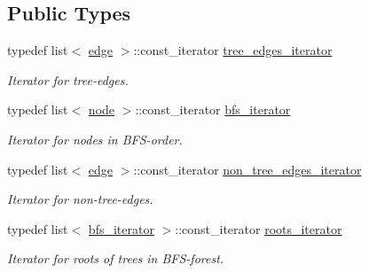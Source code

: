 \subsection*{Public Types}
\begin{DoxyCompactItemize}
\item 
\mbox{\label{classbfs_aa0b58a03ca2fc32117948ab27a806bd1}} 
typedef list$<$ \mbox{\hyperlink{classedge}{edge}} $>$\+::const\+\_\+iterator \mbox{\hyperlink{classbfs_aa0b58a03ca2fc32117948ab27a806bd1}{tree\+\_\+edges\+\_\+iterator}}
\begin{DoxyCompactList}\small\item\em Iterator for tree-\/edges. \end{DoxyCompactList}\item 
\mbox{\label{classbfs_acafce54954100cc7bc9f80eb318a7bee}} 
typedef list$<$ \mbox{\hyperlink{classnode}{node}} $>$\+::const\+\_\+iterator \mbox{\hyperlink{classbfs_acafce54954100cc7bc9f80eb318a7bee}{bfs\+\_\+iterator}}
\begin{DoxyCompactList}\small\item\em Iterator for nodes in B\+F\+S-\/order. \end{DoxyCompactList}\item 
\mbox{\label{classbfs_aecd86c7c1f1086d4b6b11c2a0eb12afe}} 
typedef list$<$ \mbox{\hyperlink{classedge}{edge}} $>$\+::const\+\_\+iterator \mbox{\hyperlink{classbfs_aecd86c7c1f1086d4b6b11c2a0eb12afe}{non\+\_\+tree\+\_\+edges\+\_\+iterator}}
\begin{DoxyCompactList}\small\item\em Iterator for non-\/tree-\/edges. \end{DoxyCompactList}\item 
\mbox{\label{classbfs_a386ac6f3c63e38c3f5263e15c3ab9d01}} 
typedef list$<$ \mbox{\hyperlink{classbfs_acafce54954100cc7bc9f80eb318a7bee}{bfs\+\_\+iterator}} $>$\+::const\+\_\+iterator \mbox{\hyperlink{classbfs_a386ac6f3c63e38c3f5263e15c3ab9d01}{roots\+\_\+iterator}}
\begin{DoxyCompactList}\small\item\em Iterator for roots of trees in B\+F\+S-\/forest. \end{DoxyCompactList}\end{DoxyCompactItemize}
